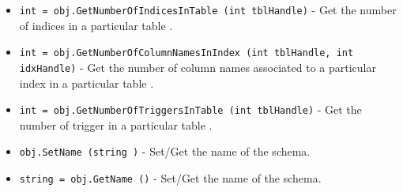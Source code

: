 \begin{itemize}
\item  \verb|int = obj.GetNumberOfIndicesInTable (int tblHandle)| -  Get the number of indices in a particular table .

\item  \verb|int = obj.GetNumberOfColumnNamesInIndex (int tblHandle, int idxHandle)| -  Get the number of column names associated to a particular index in a particular table .

\item  \verb|int = obj.GetNumberOfTriggersInTable (int tblHandle)| -  Get the number of trigger in a particular table .

\item  \verb|obj.SetName (string )| -  Set/Get the name of the schema.

\item  \verb|string = obj.GetName ()| -  Set/Get the name of the schema.

\end{itemize}
